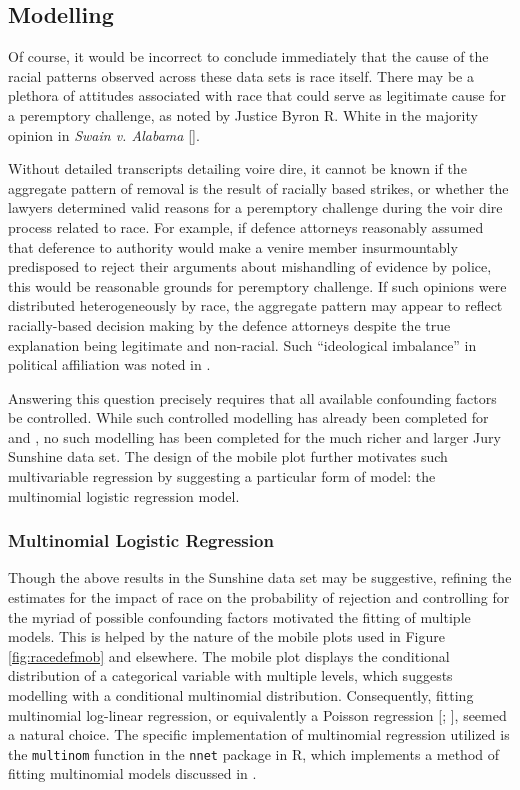 \subsection{Modelling} \label{sec:mods}

Of course, it would be incorrect to conclude immediately that the cause of the racial patterns observed across these data sets is
race itself. There may be a plethora of attitudes associated with race that could serve as legitimate cause for a peremptory
challenge, as noted by Justice Byron R. White in the majority opinion in \textit{Swain v. Alabama} [\cite{swainvalabama}].

Without detailed transcripts detailing voire dire, it cannot be known if the aggregate pattern of removal is the result of racially based strikes, or whether the lawyers
determined valid reasons for a peremptory challenge during the voir dire process related to race. For example, if
defence attorneys reasonably assumed that deference to authority would make a venire member insurmountably predisposed to reject
their arguments about mishandling of evidence by police, this would be reasonable grounds for
peremptory challenge. If such opinions were distributed heterogeneously by race, the aggregate pattern may appear to reflect
racially-based decision making by the defence attorneys despite the
true explanation being legitimate and non-racial. Such ``ideological imbalance'' in political affiliation was noted in \cite{revesz2016}.

Answering this question precisely requires that all available confounding factors be controlled. While such controlled modelling has already been completed for \cite{StubbornLegacy} and \cite{PerempChalMurder}, no such modelling has been completed for the much richer and larger Jury Sunshine data set. The design of the mobile plot further motivates such multivariable regression by suggesting a particular form of model: the multinomial logistic regression model.

\subsubsection{Multinomial Logistic Regression}

Though the above results in the Sunshine data set may be suggestive, refining the estimates for the impact of race on the
probability of rejection and controlling for the myriad of possible confounding factors motivated the fitting of multiple
models. This is helped by the nature of the mobile plots used in
Figure \ref{fig:racedefmob} and elsewhere. The mobile plot displays the
conditional distribution of a categorical variable with multiple levels, which suggests modelling with a conditional multinomial
distribution. Consequently, fitting multinomial log-linear regression, or equivalently a Poisson regression [\cite{baker1994}; \cite{lang1996}], seemed a natural choice. The specific implementation of multinomial regression utilized is the
\texttt{multinom} function in the \texttt{nnet} package in R, which implements a method of fitting multinomial models discussed
in \cite{nnet}.

